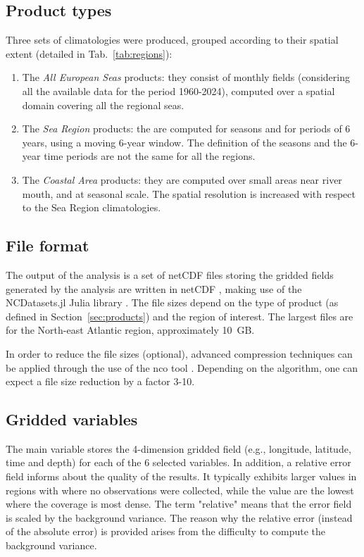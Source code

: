 \documentclass[essd, manuscript]{copernicus}
\begin{document}
\subsection{Product types\label{sec:products}}

Three sets of climatologies were produced, grouped according to their spatial extent (detailed in Tab.~\ref{tab:regions}): 
\begin{enumerate}
\item The \textit{All European Seas} products: they consist of monthly fields (considering all the available data for the period 1960-2024), computed over a spatial domain covering all the regional seas.
\item The \textit{Sea Region} products: the are computed for seasons and for periods of 6 years, using a moving 6-year window. The definition of the seasons and the 6-year time periods are not the same for all the regions. 
\item The \textit{Coastal Area} products: they are computed over small areas near river mouth, and at seasonal scale. The spatial resolution is increased with respect to the Sea Region climatologies.
\end{enumerate}

\subsection{File format}

The output of the analysis is a set of netCDF files storing the gridded fields generated by the analysis are written in netCDF \citep{Rew1990,Brown1993,Rew2006}, making use of the NCDatasets.jl Julia library \citep{Barth2024}. The file sizes depend on the type of product (as defined in Section~\ref{sec:products}) and the region of interest. The largest files are for the North-east Atlantic region, approximately 10~GB.

In order to reduce the file sizes (optional), advanced compression techniques \citep{Silver2017,Zender2016} can be applied through the use of the nco tool \citep[netCDF operators,][]{Zender2008}. Depending on the algorithm, one can expect a file size reduction by a factor 3-10. 

\subsection{Gridded variables}

The main variable stores the 4-dimension gridded field (e.g., longitude, latitude, time and depth) for each of the 6 selected variables. In addition, a relative error field informs about the quality of the results. It typically exhibits larger values in regions with where no observations were collected, while the value are the lowest where the coverage is most dense. The term "relative" means that the error field is scaled by the background variance. The reason why the relative error (instead of the absolute error) is provided arises from the difficulty to compute the background variance.  
\end{document}
